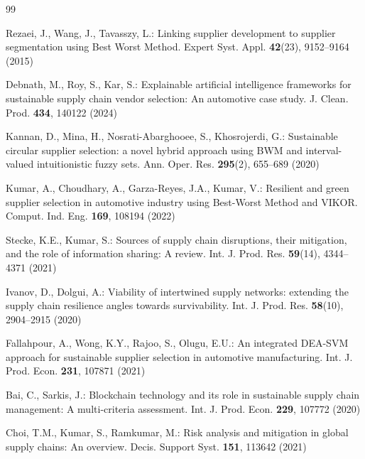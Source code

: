 \documentclass[twocolumn,10pt]{article}
\begin{document}
\begin{thebibliography}{99}

Rezaei, J., Wang, J., Tavasszy, L.: Linking supplier development to supplier segmentation using Best Worst Method. Expert Syst. Appl. \textbf{42}(23), 9152--9164 (2015)

Debnath, M., Roy, S., Kar, S.: Explainable artificial intelligence frameworks for sustainable supply chain vendor selection: An automotive case study. J. Clean. Prod. \textbf{434}, 140122 (2024)

Kannan, D., Mina, H., Nosrati-Abarghooee, S., Khosrojerdi, G.: Sustainable circular supplier selection: a novel hybrid approach using BWM and interval-valued intuitionistic fuzzy sets. Ann. Oper. Res. \textbf{295}(2), 655--689 (2020)

Kumar, A., Choudhary, A., Garza-Reyes, J.A., Kumar, V.: Resilient and green supplier selection in automotive industry using Best-Worst Method and VIKOR. Comput. Ind. Eng. \textbf{169}, 108194 (2022)

Stecke, K.E., Kumar, S.: Sources of supply chain disruptions, their mitigation, and the role of information sharing: A review. Int. J. Prod. Res. \textbf{59}(14), 4344--4371 (2021)

Ivanov, D., Dolgui, A.: Viability of intertwined supply networks: extending the supply chain resilience angles towards survivability. Int. J. Prod. Res. \textbf{58}(10), 2904--2915 (2020)

Fallahpour, A., Wong, K.Y., Rajoo, S., Olugu, E.U.: An integrated DEA-SVM approach for sustainable supplier selection in automotive manufacturing. Int. J. Prod. Econ. \textbf{231}, 107871 (2021)

Bai, C., Sarkis, J.: Blockchain technology and its role in sustainable supply chain management: A multi-criteria assessment. Int. J. Prod. Econ. \textbf{229}, 107772 (2020)

Choi, T.M., Kumar, S., Ramkumar, M.: Risk analysis and mitigation in global supply chains: An overview. Decis. Support Syst. \textbf{151}, 113642 (2021)


\end{thebibliography}
\end{document}
